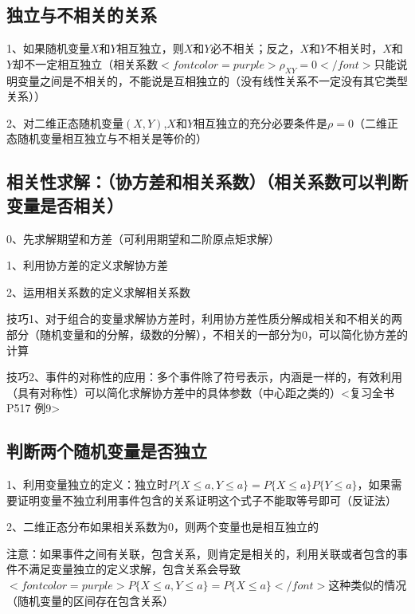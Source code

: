 \subsection{独立与不相关的关系}

1、如果随机变量$ X $和$ Y $相互独立，则$ X $和$ Y $必不相关；反之，$ X $和$ Y $不相关时，$ X $和$ Y $却不一定相互独立（相关系数$ <font color=purple>\rho_{X Y}=0</font> $只能说明变量之间是不相关的，不能说是互相独立的（没有线性关系不一定没有其它类型关系））

2、对二维正态随机变量$ (X,Y) $,$ X $和$ Y $相互独立的充分必要条件是$ \rho=0 $（二维正态随机变量相互独立与不相关是等价的）



\subsection{相关性求解：（协方差和相关系数）（相关系数可以判断变量是否相关）}

0、先求解期望和方差（可利用期望和二阶原点矩求解）

1、利用协方差的定义求解协方差

2、运用相关系数的定义求解相关系数

技巧1、对于组合的变量求解协方差时，利用协方差性质分解成相关和不相关的两部分（随机变量和的分解，级数的分解），不相关的一部分为0，可以简化协方差的计算

技巧2、事件的对称性的应用：多个事件除了符号表示，内涵是一样的，有效利用（具有对称性）可以简化求解协方差中的具体参数（中心距之类的）<复习全书P517 例9>



\subsection{判断两个随机变量是否独立}

1、利用变量独立的定义：独立时$ P\{X \le a, Y \le a\} = P\{X \le a\}P\{Y \le a\} $，如果需要证明变量不独立利用事件包含的关系证明这个式子不能取等号即可（反证法）

2、二维正态分布如果相关系数为0，则两个变量也是相互独立的

注意：如果事件之间有关联，包含关系，则肯定是相关的，利用关联或者包含的事件不满足变量独立的定义求解，包含关系会导致$ <font color=purple>P\{X \le a, Y \le a\} = P\{X \le a\}</font> $这种类似的情况（随机变量的区间存在包含关系）

